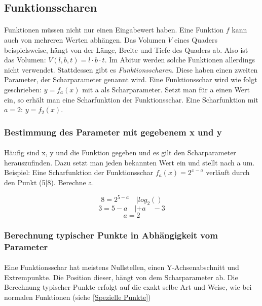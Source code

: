 \documentclass{article}
\begin{document}
	\subsection{Funktionsscharen}
		\paragraph{}
			
			Funktionen müssen nicht nur einen Eingabewert haben. Eine Funktion $f$ kann auch von mehreren Werten abhängen.
			Das Volumen $V$ eines Quaders beispielsweise, hängt von der Länge, Breite und Tiefe des Quaders ab.
			Also ist das Volumen: $V(l,b,t)=l \cdot b \cdot t$. Im Abitur werden solche Funktionen allerdings nicht verwendet.
			Stattdessen gibt es \emph{Funktionsscharen}. Diese haben einen zweiten Parameter, der Scharparameter genannt wird.
			Eine Funktionsschar wird wie folgt geschrieben: $y=f_a(x)$ mit a als Scharparameter. Setzt man für a einen Wert ein,
			so erhält man eine Scharfunktion der Funktionsschar. Eine Scharfunktion mit $a=2$: $y=f_2(x)$.

	\subsubsection{Bestimmung des Parameter mit gegebenem x und y}
		\paragraph{}
			Häufig sind x, y und die Funktion gegeben und es gilt den Scharparameter herauszufinden. Dazu setzt man jeden bekannten
			Wert ein und stellt nach a um. Beispiel: Eine Scharfunktion der Funktionsschar $f_a(x)=2^{x-a}$
			verläuft durch den Punkt (5|8). Berechne a.
			
			\[ 8=2^{5-a} \quad | log_2() \]
			\[ 3=5-a \quad | +a \quad -3 \]
			\[ a=2 \]

	\subsubsection{Berechnung typischer Punkte in Abhängigkeit vom Parameter}
		\paragraph{}
			Eine Funktionsschar hat meistens Nullstellen, einen Y-Achsenabschnitt und Extrempunkte. Die Position dieser,
			hängt von dem Scharparameter ab. Die Berechnung typischer Punkte erfolgt auf die exakt selbe Art und Weise,
			wie bei normalen Funktionen (siehe \ref{Spezielle Punkte})
\end{document}
